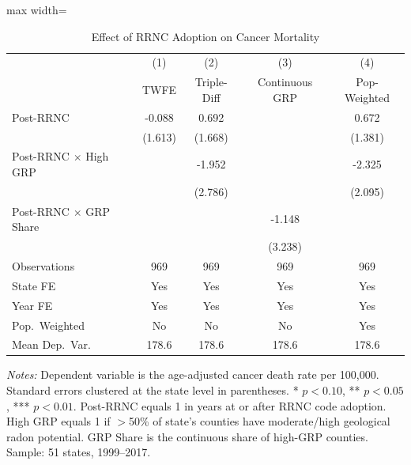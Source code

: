 \begin{table}[H]
\centering
\caption{Effect of RRNC Adoption on Cancer Mortality}
\begin{threeparttable}
\begin{adjustbox}{max width=\textwidth}
\begin{tabular}{lcccc}
\toprule
 & (1) & (2) & (3) & (4) \\
 & TWFE & Triple-Diff & Continuous GRP & Pop-Weighted \\
\midrule
Post-RRNC & -0.088 & 0.692 & & 0.672 \\
 & (1.613) & (1.668) & & (1.381) \\
Post-RRNC $\times$ High GRP & & -1.952 & & -2.325 \\
 & & (2.786) & & (2.095) \\
Post-RRNC $\times$ GRP Share & & & -1.148 & \\
 & & & (3.238) & \\
\midrule
Observations & 969 & 969 & 969 & 969 \\
State FE & Yes & Yes & Yes & Yes \\
Year FE & Yes & Yes & Yes & Yes \\
Pop.~Weighted & No & No & No & Yes \\
Mean Dep.~Var. & 178.6 & 178.6 & 178.6 & 178.6 \\
\bottomrule
\end{tabular}
\end{adjustbox}
\begin{tablenotes}[flushleft]
\small
\item \textit{Notes:} Dependent variable is the age-adjusted cancer death rate per 100,000. Standard errors clustered at the state level in parentheses. * $p<0.10$, ** $p<0.05$, *** $p<0.01$. Post-RRNC equals 1 in years at or after RRNC code adoption. High GRP equals 1 if $>$50\% of state's counties have moderate/high geological radon potential. GRP Share is the continuous share of high-GRP counties. Sample: 51 states, 1999--2017.
\end{tablenotes}
\end{threeparttable}
\label{tab:main}
\end{table}
